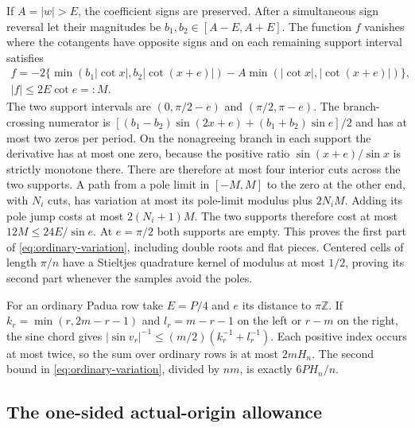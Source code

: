 If $A=|w|>E$, the coefficient signs are preserved. After a simultaneous
sign reversal let their magnitudes be $b_1,b_2\in[A-E,A+E]$. The
function $f$ vanishes where the cotangents have opposite signs and on
each remaining support interval satisfies
\begin{gather*}
 f=-2\{\min(b_1|\cot x|,b_2|\cot(x+e)|)
                   -A\min(|\cot x|,|\cot(x+e)|)\},\\
 |f|\leq2E\cot e=:M.
\end{gather*}
The two support intervals are $(0,\pi/2-e)$ and $(\pi/2,\pi-e)$.
The branch-crossing numerator is
$[(b_1-b_2)\sin(2x+e)+(b_1+b_2)\sin e]/2$ and has at most two
zeros per period. On the nonagreeing branch in each support the
derivative has at most one zero, because the positive ratio
$\sin(x+e)/\sin x$ is strictly monotone there. There are therefore
at most four interior cuts across the two supports. A path from a
pole limit in $[-M,M]$ to the zero at the other end, with $N_i$ cuts,
has variation at most its pole-limit modulus plus $2N_iM$.
Adding its pole jump costs at most $2(N_i+1)M$. The two supports
therefore cost at most $12M\leq24E/\sin e$. At $e=\pi/2$ both
supports are empty. This proves the first part of
\eqref{eq:ordinary-variation}, including double roots and flat pieces.
Centered cells of length $\pi/n$ have a Stieltjes quadrature kernel
of modulus at most $1/2$, proving its second part whenever the samples
avoid the poles.

For an ordinary Padua row take $E=P/4$ and $e$ its distance to
$\pi\mathbb Z$. If
$k_r=\min(r,2m-r-1)$ and
$l_r=m-r-1$ on the left or $r-m$ on the right, the sine chord gives
$|\sin v_r|^{-1}\leq(m/2)(k_r^{-1}+l_r^{-1})$. Each positive index
occurs at most twice, so the sum over ordinary rows is at most
$2mH_n$. The second bound in \eqref{eq:ordinary-variation}, divided
by $nm$, is exactly $6PH_n/n$.

\subsection{The one-sided actual-origin allowance}

